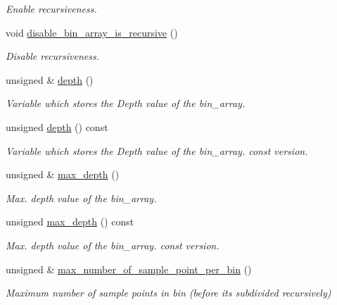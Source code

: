 \begin{DoxyCompactItemize}
\begin{DoxyCompactList}\small\item\em Enable recursiveness. \end{DoxyCompactList}\item 
void \hyperlink{classoomph_1_1RefineableBinArrayParameters_ad2922f7c04fcc8a21aec0ab8c6a0651b}{disable\+\_\+bin\+\_\+array\+\_\+is\+\_\+recursive} ()
\begin{DoxyCompactList}\small\item\em Disable recursiveness. \end{DoxyCompactList}\item 
unsigned \& \hyperlink{classoomph_1_1RefineableBinArrayParameters_a4056b694152383da1440ff8ee62811b8}{depth} ()
\begin{DoxyCompactList}\small\item\em Variable which stores the Depth value of the bin\+\_\+array. \end{DoxyCompactList}\item 
unsigned \hyperlink{classoomph_1_1RefineableBinArrayParameters_a198892de079e38ec6b7e3e39c878ffd5}{depth} () const
\begin{DoxyCompactList}\small\item\em Variable which stores the Depth value of the bin\+\_\+array. const version. \end{DoxyCompactList}\item 
unsigned \& \hyperlink{classoomph_1_1RefineableBinArrayParameters_a7d341ba18f784b2669f9e75561ea3321}{max\+\_\+depth} ()
\begin{DoxyCompactList}\small\item\em Max. depth value of the bin\+\_\+array. \end{DoxyCompactList}\item 
unsigned \hyperlink{classoomph_1_1RefineableBinArrayParameters_a5e27c9afc435df8c4980349a12373c78}{max\+\_\+depth} () const
\begin{DoxyCompactList}\small\item\em Max. depth value of the bin\+\_\+array. const version. \end{DoxyCompactList}\item 
unsigned \& \hyperlink{classoomph_1_1RefineableBinArrayParameters_a9a5739f3fed040e8d342d5b46f43151b}{max\+\_\+number\+\_\+of\+\_\+sample\+\_\+point\+\_\+per\+\_\+bin} ()
\begin{DoxyCompactList}\small\item\em Maximum number of sample points in bin (before it\textquotesingle{}s subdivided recursively) \end{DoxyCompactList}\item 

\end{DoxyCompactItemize}
